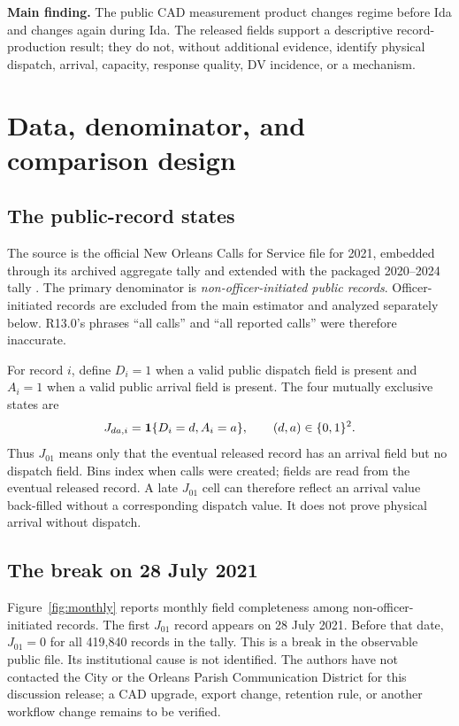 \documentclass[11pt]{article}
\begin{document}
\begin{resultbox}
\textbf{Main finding.} The public CAD measurement product changes regime before Ida and changes again during Ida. The released fields support a descriptive record-production result; they do not, without additional evidence, identify physical dispatch, arrival, capacity, response quality, DV incidence, or a mechanism.
\end{resultbox}

\section{Data, denominator, and comparison design}

\subsection{The public-record states}

The source is the official New Orleans Calls for Service file for 2021, embedded through its archived aggregate tally and extended with the packaged 2020--2024 tally \citep{DataNOLA2021}. The primary denominator is \emph{non-officer-initiated public records}. Officer-initiated records are excluded from the main estimator and analyzed separately below. R13.0's phrases ``all calls'' and ``all reported calls'' were therefore inaccurate.

For record $i$, define $D_i=1$ when a valid public dispatch field is present and $A_i=1$ when a valid public arrival field is present. The four mutually exclusive states are
\begin{equation}
J_{da,i}=\mathbf{1}\{D_i=d,A_i=a\},\qquad (d,a)\in\{0,1\}^2.
\end{equation}
Thus $J_{01}$ means only that the eventual released record has an arrival field but no dispatch field. Bins index when calls were created; fields are read from the eventual released record. A late $J_{01}$ cell can therefore reflect an arrival value back-filled without a corresponding dispatch value. It does not prove physical arrival without dispatch.

\subsection{The break on 28 July 2021}

Figure~\ref{fig:monthly} reports monthly field completeness among non-officer-initiated records. The first $J_{01}$ record appears on 28 July 2021. Before that date, $J_{01}=0$ for all 419,840 records in the tally. This is a break in the observable public file. Its institutional cause is not identified. The authors have not contacted the City or the Orleans Parish Communication District for this discussion release; a CAD upgrade, export change, retention rule, or another workflow change remains to be verified.
\end{document}
